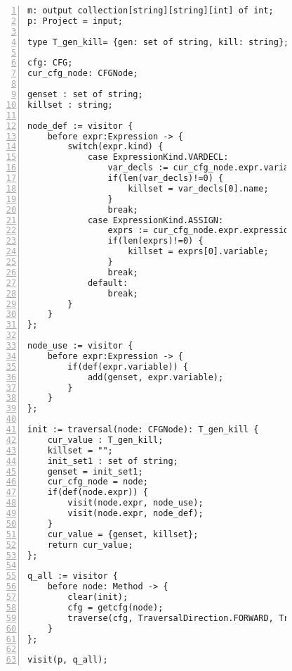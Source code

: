 \begin{figure}[ht!]
\begin{lstlisting}[numbers=left, tabsize=4, escapechar=@, caption={Used defined variable},label={lst:udv-code}] 
m: output collection[string][string][int] of int;
p: Project = input;

type T_gen_kill= {gen: set of string, kill: string};

cfg: CFG;
cur_cfg_node: CFGNode;

genset : set of string;
killset : string;

node_def := visitor {
	before expr:Expression -> {
		switch(expr.kind) {
			case ExpressionKind.VARDECL: 
				var_decls := cur_cfg_node.expr.variable_decls;
				if(len(var_decls)!=0) {
					killset = var_decls[0].name;
				}				
				break;
			case ExpressionKind.ASSIGN: 
				exprs := cur_cfg_node.expr.expressions;
				if(len(exprs)!=0) {				
					killset = exprs[0].variable;
				}
				break;
			default:
				break;
		}
	}
};

node_use := visitor {
	before expr:Expression -> {
		if(def(expr.variable)) {
			add(genset, expr.variable);			
		}
	}
};

init := traversal(node: CFGNode): T_gen_kill {
	cur_value : T_gen_kill;
	killset = "";
	init_set1 : set of string;
	genset = init_set1;
	cur_cfg_node = node;
	if(def(node.expr)) {
		visit(node.expr, node_use);
		visit(node.expr, node_def);
	}
	cur_value = {genset, killset};
	return cur_value;
};

q_all := visitor {
	before node: Method -> {			
		clear(init);
		cfg = getcfg(node);
		traverse(cfg, TraversalDirection.FORWARD, TraversalKind.HYBRID, init);
	}
};

visit(p, q_all);
\end{lstlisting}
\end{figure}